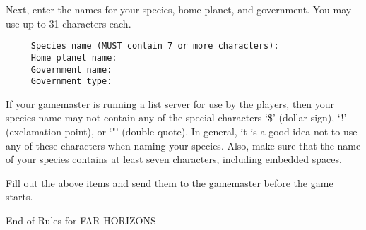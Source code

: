 \documentclass[10pt,titlepage]{article}
\begin{document}
Next, enter the names for your species, home planet, and government.
You may use up to 31 characters each.

\begin{verbatim}
     Species name (MUST contain 7 or more characters):
     Home planet name:
     Government name:
     Government type:\end{verbatim} 

\begin{importantnote}
	If your gamemaster is running a list server for use
	by the players, then your species name may not contain any of
	the special characters `\$' (dollar sign), `!' (exclamation
	point), or `"' (double quote).  In general, it is a good idea
	not to use any of these characters when naming your species.
	Also, make sure that the name of your species contains at
	least seven characters, including embedded spaces.
\end{importantnote}

Fill out the above items and send them to the gamemaster before the game
starts.


\begin{center}
		End of Rules for FAR HORIZONS\end{center} 
\end{document}
